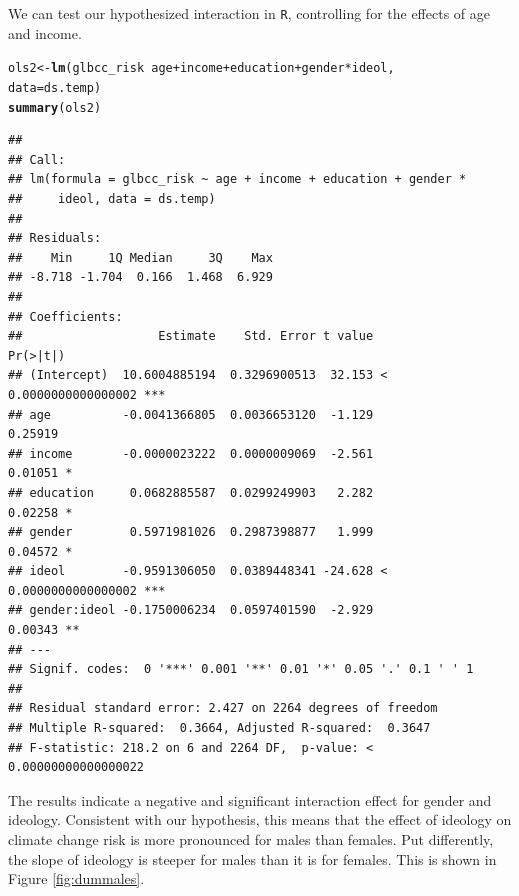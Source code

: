 \documentclass[11pt,openany]{book}\usepackage[]{graphicx}\usepackage[]{color}
\makeatletter
\newcommand{\hlopt}[1]{\textcolor[rgb]{0,0,0}{#1}}%
\newcommand{\hlstd}[1]{\textcolor[rgb]{0.345,0.345,0.345}{#1}}%
\newcommand{\hlkwb}[1]{\textcolor[rgb]{0.69,0.353,0.396}{#1}}%
\newcommand{\hlkwc}[1]{\textcolor[rgb]{0.333,0.667,0.333}{#1}}%
\newcommand{\hlkwd}[1]{\textcolor[rgb]{0.737,0.353,0.396}{\textbf{#1}}}%
\newenvironment{kframe}{%
 \def\at@end@of@kframe{}%
 \ifinner\ifhmode%
  \def\at@end@of@kframe{\end{minipage}}%
  \begin{minipage}{\columnwidth}%
 \fi\fi%
 \def\FrameCommand##1{\hskip\@totalleftmargin \hskip-\fboxsep
 \colorbox{shadecolor}{##1}\hskip-\fboxsep
     \hskip-\linewidth \hskip-\@totalleftmargin \hskip\columnwidth}%
 \MakeFramed {\advance\hsize-\width
   \@totalleftmargin\z@ \linewidth\hsize
   \@setminipage}}%
 {\par\unskip\endMakeFramed%
 \at@end@of@kframe}
\newenvironment{knitrout}{}{} %
\renewenvironment{knitrout}{\begin{singlespace}}{\end{singlespace}}
\makeatother
\begin{document}
We can test our hypothesized interaction in \texttt{R}, controlling for the effects of age
and income. 
\begin{knitrout}
\color{fgcolor}\begin{kframe}
\begin{alltt}
\hlstd{ols2} \hlkwb{<-} \hlkwd{lm}\hlstd{(glbcc_risk} \hlopt{~} \hlstd{age} \hlopt{+} \hlstd{income} \hlopt{+} \hlstd{education} \hlopt{+} \hlstd{gender} \hlopt{*} \hlstd{ideol,}
    \hlkwc{data} \hlstd{= ds.temp)}
\hlkwd{summary}\hlstd{(ols2)}
\end{alltt}
\begin{verbatim}
## 
## Call:
## lm(formula = glbcc_risk ~ age + income + education + gender * 
##     ideol, data = ds.temp)
## 
## Residuals:
##    Min     1Q Median     3Q    Max 
## -8.718 -1.704  0.166  1.468  6.929 
## 
## Coefficients:
##                   Estimate    Std. Error t value             Pr(>|t|)    
## (Intercept)  10.6004885194  0.3296900513  32.153 < 0.0000000000000002 ***
## age          -0.0041366805  0.0036653120  -1.129              0.25919    
## income       -0.0000023222  0.0000009069  -2.561              0.01051 *  
## education     0.0682885587  0.0299249903   2.282              0.02258 *  
## gender        0.5971981026  0.2987398877   1.999              0.04572 *  
## ideol        -0.9591306050  0.0389448341 -24.628 < 0.0000000000000002 ***
## gender:ideol -0.1750006234  0.0597401590  -2.929              0.00343 ** 
## ---
## Signif. codes:  0 '***' 0.001 '**' 0.01 '*' 0.05 '.' 0.1 ' ' 1
## 
## Residual standard error: 2.427 on 2264 degrees of freedom
## Multiple R-squared:  0.3664,	Adjusted R-squared:  0.3647 
## F-statistic: 218.2 on 6 and 2264 DF,  p-value: < 0.00000000000000022
\end{verbatim}
\end{kframe}
\end{knitrout}
The results indicate a negative and significant interaction effect for gender and ideology. Consistent with our hypothesis, this means that the effect of ideology on climate change risk is more pronounced for males than females. Put differently, the slope of ideology is steeper for males than it is for females. This is shown in Figure \ref{fig:dummales}. 
\end{document}
